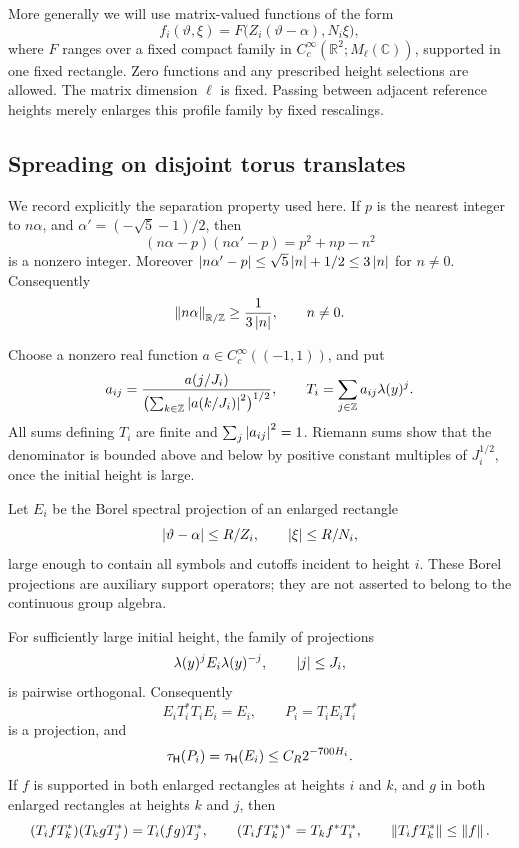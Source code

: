 More generally we will use matrix-valued functions of the form
\begin{equation}
\label{eq:profile-family}
 f_i(\vartheta,\xi)=F\bigl(Z_i(\vartheta-\alpha),N_i\xi\bigr),
\end{equation}
where \(F\) ranges over a fixed compact family in
\(C_c^\infty(\mathbb R^2;M_\ell(\mathbb C))\), supported in one fixed
rectangle.  Zero functions and any prescribed height selections are allowed.
The matrix dimension \(\ell\) is fixed.  Passing between adjacent reference
heights merely enlarges this profile family by fixed rescalings.

\subsection{Spreading on disjoint torus translates}

We record explicitly the separation property used here.  If \(p\) is the nearest
integer to \(n\alpha\), and
\(\alpha'=(-\sqrt5-1)/2\), then
\[
 (n\alpha-p)(n\alpha'-p)=p^2+np-n^2
\]
is a nonzero integer.  Moreover
\(\left\lvert n\alpha'-p\right\rvert\leq\sqrt5\left\lvert n\right\rvert+1/2\leq3\left\lvert n\right\rvert\) for \(n\ne0\).
Consequently
\begin{equation}
\label{eq:golden-separation}
 \left\lVert n\alpha\right\rVert_{\mathbb R/\mathbb Z}\geq\frac{1}{3\left\lvert n\right\rvert},
 \qquad n\ne0.
\end{equation}

Choose a nonzero real function \(a\in C_c^\infty((-1,1))\), and put
\[
 a_{ij}=\frac{a(j/J_i)}{\bigl(\sum_{k\in\mathbb Z}
                      \left\lvert a(k/J_i)\right\rvert^2\bigr)^{1/2}},\qquad
 T_i=\sum_{j\in\mathbb Z}a_{ij}\lambda(y)^j.
\]
All sums defining \(T_i\) are finite and \(\sum_j\left\lvert a_{ij}\right\rvert^2=1\).
Riemann sums show that the denominator is bounded above and below by positive
constant multiples of \(J_i^{1/2}\), once the initial height is large.

Let \(E_i\) be the Borel spectral projection of an enlarged rectangle
\[
 \left\lvert\vartheta-\alpha\right\rvert\leq R/Z_i,\qquad
 \left\lvert\xi\right\rvert\leq R/N_i,
\]
large enough to contain all symbols and cutoffs incident to height \(i\).
These Borel projections are auxiliary support operators; they are not asserted
to belong to the continuous group algebra.

\begin{lemma}
\label{lem:supported-spreading}
For sufficiently large initial height, the family of projections
\[
 \lambda(y)^jE_i\lambda(y)^{-j},\qquad \left\lvert j\right\rvert\leq J_i,
\]
is pairwise orthogonal.  Consequently
\[
 E_iT_i^*T_iE_i=E_i,\qquad P_i=T_iE_iT_i^*
\]
is a projection, and
\begin{equation}
\label{eq:spread-trace}
 \tau_{\mathsf H}(P_i)=\tau_{\mathsf H}(E_i)
 \leq C_R2^{-700H_i}.
\end{equation}
If \(f\) is supported in both enlarged rectangles at heights \(i\) and \(k\),
and \(g\) in both enlarged rectangles at heights \(k\) and \(j\), then
\[
 (T_i fT_k^*)(T_k gT_j^*)=T_i(fg)T_j^*,\qquad
 (T_i fT_k^*)^*=T_k f^*T_i^*,\qquad
 \left\lVert T_i fT_k^*\right\rVert\leq\left\lVert f\right\rVert.
\]
\end{lemma}

